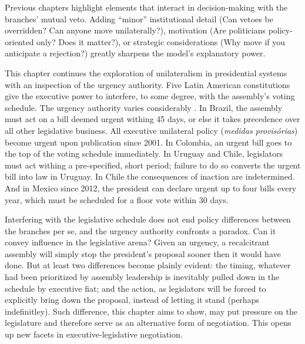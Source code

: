 \documentclass[letter,12pt]{article}
\begin{document}
Previous chapters highlight elements that interact in decision-making with the branches' mutual veto. Adding ``minor'' institutional detail (Can vetoes be overridden? Can anyone move unilaterally?), motivation (Are politicians policy-oriented only? Does it matter?), or strategic considerations (Why move if you anticipate a rejection?) greatly sharpens the model's explanatory power. 


This chapter continues the exploration of unilateralism in presidential systems with an inspection of the urgency authority. Five Latin American constitutions give the executive power to interfere, to some degree, with the assembly's voting schedule. The urgency authority varies considerably \citep[][:437]{morgenstern.2002b}. In Brazil, the assembly must act on a bill deemed urgent withing 45 days, or else it takes precedence over all other legislative business. All executive unilateral policy (\emph{medidas provis\'orias}) become urgent upon publication since 2001. In Colombia, an urgent bill goes to the top of the voting schedule immediately. In Uruguay and Chile, legislators must act withing a pre-specified, short period; failure to do so converts the urgent bill into law in Uruguay. In Chile the consequences of inaction are indetermined. And in Mexico since 2012, the president can declare urgent up to four bills every year, which must be scheduled for a floor vote within 30 days. 

Interfering with the legislative schedule does not end policy differences between the branches per se, and the urgency authority confronts a paradox. Can it convey influence in the legislative arena? Given an urgency, a recalcitrant assembly will simply stop the president's proposal sooner then it would have done. But at least two differences become plainly evident: the timing, whatever had been prioritized by assembly leadership is inevitably pulled down in the schedule by executive fiat; and the action, as legislators will be forced to explicitly bring down the proposal, instead of letting it stand (perhaps indefinitley). Such difference, this chapter aims to show, may put pressure on the legislature and therefore serve as an alternative form of negotiation. This opens up new facets in executive-legislative negotiation. 
\end{document}
